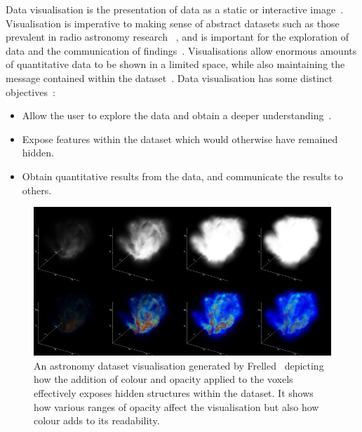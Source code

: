 Data visualisation is the presentation of data as a static or interactive image~\cite{Bikakis2018}.
Visualisation is imperative to making sense of abstract datasets such as those prevalent in radio astronomy research ~\cite{Glueck2014, Yang2017},
and is important for the exploration of data and the communication of findings~\cite{Ferrand2018}.
Visualisations allow enormous amounts of quantitative data to be shown in a limited space, while also maintaining the message contained within the dataset~\cite{Fisher2012}.
Data visualisation has some distinct objectives~\cite{Norris1994, McReynolds2005, Hassan2011}: 
\begin{itemize}
    \item Allow the user to explore the data and obtain a deeper understanding~\cite{Bikakis2018}.
    \item Expose features within the dataset which would otherwise have remained hidden.
    \item Obtain quantitative results from the data, and communicate the results to others.
\end{itemize}

\begin{figure}
    \centering
    \includegraphics[width=1\linewidth]{figures/volume.jpg}
    \caption{An astronomy dataset visualisation generated by Frelled~\cite{Taylor2015} depicting how the addition of colour and opacity applied to the voxels effectively exposes hidden structures within the dataset. It shows how various ranges of opacity affect the visualisation but also how colour adds to its readability.}
    \label{fig:volume}
\end{figure}

